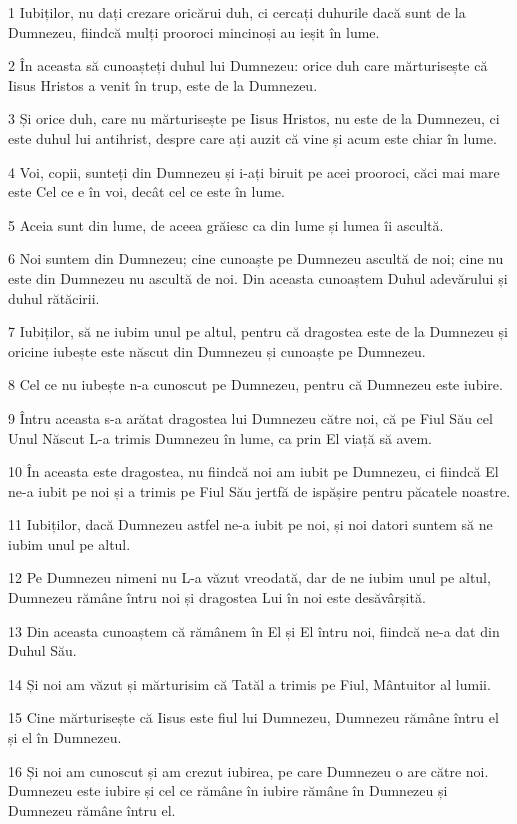 \par 1 Iubiților, nu dați crezare oricărui duh, ci cercați duhurile dacă sunt de la Dumnezeu, fiindcă mulți prooroci mincinoși au ieșit în lume.
\par 2 În aceasta să cunoașteți duhul lui Dumnezeu: orice duh care mărturisește că Iisus Hristos a venit în trup, este de la Dumnezeu.
\par 3 Și orice duh, care nu mărturisește pe Iisus Hristos, nu este de la Dumnezeu, ci este duhul lui antihrist, despre care ați auzit că vine și acum este chiar în lume.
\par 4 Voi, copii, sunteți din Dumnezeu și i-ați biruit pe acei prooroci, căci mai mare este Cel ce e în voi, decât cel ce este în lume.
\par 5 Aceia sunt din lume, de aceea grăiesc ca din lume și lumea îi ascultă.
\par 6 Noi suntem din Dumnezeu; cine cunoaște pe Dumnezeu ascultă de noi; cine nu este din Dumnezeu nu ascultă de noi. Din aceasta cunoaștem Duhul adevărului și duhul rătăcirii.
\par 7 Iubiților, să ne iubim unul pe altul, pentru că dragostea este de la Dumnezeu și oricine iubește este născut din Dumnezeu și cunoaște pe Dumnezeu.
\par 8 Cel ce nu iubește n-a cunoscut pe Dumnezeu, pentru că Dumnezeu este iubire.
\par 9 Întru aceasta s-a arătat dragostea lui Dumnezeu către noi, că pe Fiul Său cel Unul Născut L-a trimis Dumnezeu în lume, ca prin El viață să avem.
\par 10 În aceasta este dragostea, nu fiindcă noi am iubit pe Dumnezeu, ci fiindcă El ne-a iubit pe noi și a trimis pe Fiul Său jertfă de ispășire pentru păcatele noastre.
\par 11 Iubiților, dacă Dumnezeu astfel ne-a iubit pe noi, și noi datori suntem să ne iubim unul pe altul.
\par 12 Pe Dumnezeu nimeni nu L-a văzut vreodată, dar de ne iubim unul pe altul, Dumnezeu rămâne întru noi și dragostea Lui în noi este desăvârșită.
\par 13 Din aceasta cunoaștem că rămânem în El și El întru noi, fiindcă ne-a dat din Duhul Său.
\par 14 Și noi am văzut și mărturisim că Tatăl a trimis pe Fiul, Mântuitor al lumii.
\par 15 Cine mărturisește că Iisus este fiul lui Dumnezeu, Dumnezeu rămâne întru el și el în Dumnezeu.
\par 16 Și noi am cunoscut și am crezut iubirea, pe care Dumnezeu o are către noi. Dumnezeu este iubire și cel ce rămâne în iubire rămâne în Dumnezeu și Dumnezeu rămâne întru el.
